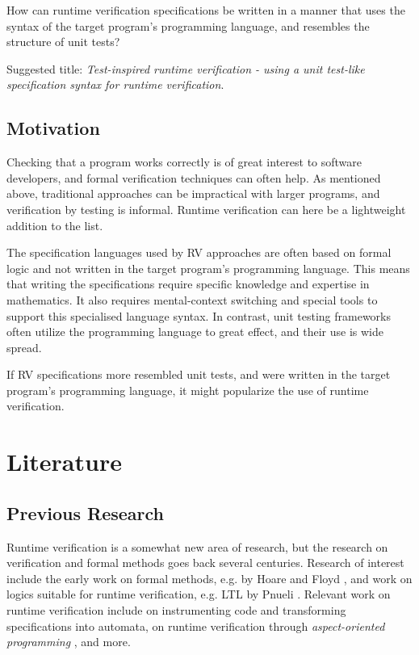 \documentclass[a4paper,11pt]{article}
\begin{document}
How can runtime verification specifications be written in a manner that uses the syntax of
the target program's programming language, and resembles the structure of unit tests?

Suggested title: \textit{Test-inspired runtime verification - using a unit test-like specification syntax for runtime verification}.


\subsection{Motivation}

Checking that a program works correctly is of great interest to software developers, and
formal verification techniques can often help. As mentioned above, traditional approaches
can be impractical with larger programs, and verification by testing is informal.
Runtime verification can here be a lightweight addition to the list.

The specification languages used by RV approaches are often based
on formal logic and not written in the target program's programming language. 
This means that writing the specifications require specific knowledge and expertise in mathematics. 
It also requires mental-context switching and special tools
to support this specialised language syntax. In contrast, unit testing frameworks often
utilize the programming language to great effect, and their use is wide spread.

If RV specifications more resembled unit tests, and were written in the target program's
programming language, it might popularize the use of runtime verification.


\section{Literature}

\subsection{Previous Research}

Runtime verification is a somewhat new area of research, but the research on verification and formal methods goes back several centuries. Research of interest include the early work on formal methods, e.g. by Hoare \cite{hoare69} and Floyd \cite{floyd67}, and work on logics suitable for runtime verification, e.g. LTL by Pnueli \cite{pnueli77}. Relevant work on runtime verification include \cite{bauer06} on instrumenting code and transforming specifications into automata, \cite{bodden05} on runtime verification through \emph{aspect-oriented programming} \cite{aspectj}, and more. 
\end{document}
